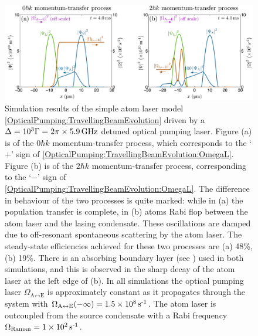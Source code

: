 \begin{figure}
    \centering
    \includegraphics[width=15cm]{TravellingBeamFarDetunedResults}
    \caption{Simulation results of the simple atom laser model \eqref{OpticalPumping:TravellingBeamEvolution} driven by a $\Delta = 10^3 \Gamma = 2 \pi \times \unit[5.9]{GHz}$ detuned optical pumping laser.  Figure (a) is of the $0 \hbar k$ momentum-transfer process, which corresponds to the `$+$' sign of \eqref{OpticalPumping:TravellingBeamEvolution:OmegaL}.  Figure (b) is of the $2 \hbar k$ momentum-transfer process, corresponding to the `$-$' sign of \eqref{OpticalPumping:TravellingBeamEvolution:OmegaL}.  The difference in behaviour of the two processes is quite marked: while in (a) the population transfer is complete, in (b) atoms Rabi flop between the atom laser and the lasing condensate.  These oscillations are damped due to off-resonant spontaneous scattering by the atom laser.  The steady-state efficiencies achieved for these two processes are (a) 48\%, (b) 19\%.  There is an absorbing boundary layer (see ) used in both simulations, and this is observed in the sharp decay of the atom laser at the left edge of (b).  In all simulations the optical pumping laser $\Omega_{\text{A} \leftrightarrow \text{E}}$ is approximately constant as it propagates through the system with $\Omega_{\text{A}\leftrightarrow \text{E}}(-\infty) = 1.5 \times \unit[10^8]{s\textsuperscript{-1}}$.  The atom laser is outcoupled from the source condensate with a Rabi frequency $\Omega_\text{Raman} = 1 \times \unit[10^2]{s\textsuperscript{-1}}$.}
    \label{OpticalPumping:TravellingBeamFarDetunedResults}
\end{figure}

